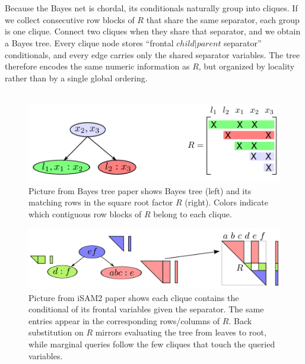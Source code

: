 \\ \\
Because the Bayes net is chordal, its conditionals naturally group into cliques. If we collect consecutive row blocks of $R$ that share the same separator, each group is one clique. Connect two cliques when they share that separator, and we obtain a Bayes tree. Every clique node stores ``frontal $child|parent$ separator'' conditionals, and every edge carries only the shared separator variables. The tree therefore encodes the same numeric information as $R$, but organized by locality rather than by a single global ordering.
\\ \\
\begin{figure}[H]
    \centering
    \includegraphics[width=0.98\linewidth]{Pictures/Optimizers/iSAM2/R_matrix_as_bayes_tree1.png}
    \caption{Picture from Bayes tree paper \cite{Bayes_tree_for_SLAM_paper} shows Bayes tree (left) and its matching rows in the square root factor $R$ (right). Colors indicate which contiguous row blocks of $R$ belong to each clique.}
    \label{fig:optimizer-iSAM2-R-to-tree-1}
\end{figure}
\begin{figure}[H]
    \centering
    \includegraphics[width=0.98\linewidth]{Pictures/Optimizers/iSAM2/R_matrix_as_bayes_tree2.png}
    \caption{Picture from iSAM2 paper \cite{iSAM2_paper} shows each clique contains the conditional of its frontal variables given the separator. The same entries appear in the corresponding rows/columns of $R$. Back substitution on $R$ mirrors evaluating the tree from leaves to root, while marginal queries follow the few cliques that touch the queried variables.}
    \label{fig:optimizer-iSAM2-R-to-tree-2}
\end{figure}
